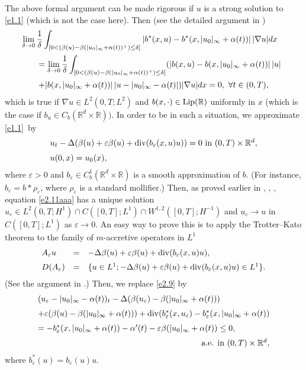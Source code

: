 \documentclass[12pt]{article}
\def\rrd{{\rr^d}}
\def\vsp{\vspace*{1,5mm}\\ }
\def\dd{\displaystyle}
\def\D{{\Delta}}
\def\barr{\begin{array}}
\def\earr{\end{array}}
\def\D{{\Delta}}
\theoremstyle{definition}
\def\1{^{-1}}
\def\vsp{\vspace*{2mm}\\ }
\def\rr{{\mathbb{R}}}
\def\9{{\infty}}
\def\a{{\alpha}}
\def\b{{\beta}}
\def\D{{\Delta}}
\def\vp{{\varepsilon}}
\def\barr{\begin{array}}
\def\earr{\end{array}}
\def\dd{\displaystyle}
\def\vsp{\vspace*{2mm}\\ }
\def\ff{\forall }
\begin{document}
The above formal argument can be made rigorous if $u$ is a strong solution to \eqref{e1.1} (which is not the case here). Then (see the detailed argument in \cite{1})
\begin{equation}\label{e2.11aa}
\hspace*{-2mm}\barr{l}
\dd\lim_{\delta\to0}\frac1\delta
\int_{[0<(\beta(u)-\beta(|u_0|_\9+\a(t))^+)\le\delta]}
|b^*(x,u)-b^*(x,|u_0|_\9+\a(t))|\,|\nabla u|dx\vsp
\qquad=\dd\lim_{\delta\to0}\frac1\delta
\int_{[0<(\beta(u)-\beta(|u_0|_\9+\a(t))^+)\le\delta]}
(|b(x,u)-b(x,|u_0|_\9+\a(t))|\,|u|
\vsp\qquad+|b(x,|u_0|_\9+\a(t))|\,|u-|u_0|_\9-\a(t)|)|\nabla u|dx=0,\ \ff t\in(0,T),\earr\end{equation}which is true if $\nabla u\in L^2(0,T;L^2)$ and $b(x,\cdot)\in{\rm Lip}(\rr)$ uniformly in $x$ (which is the case if $b_u\in C_b(\rrd\times\rr))$. In order to be in  such a situation, we approximate \eqref{e1.1}~by
\begin{equation}\label{e2.11aaa}
\barr{l}
u_t-\D(\b(u)+\vp\b(u)+{\rm div}(b_\vp(x,u)u))=0\mbox{ in }(0,T)\times\rrd,\vsp
u(0,x)=u_0(x),\earr\end{equation}where $\vp>0$ and $b_\vp\in C^1_b(\rrd\times\rr)$ is a smooth approximation of $b$. (For instance, $b_\vp=b*\rho_\vp$, where $\rho_\vp$ is a standard mollifier.) Then, as proved earlier in \cite{1}, \cite{2az}, \cite{2}, equation \eqref{e2.11aaa} has a unique solution $u_\vp\in L^2(0,T;H^1)\cap C([0,T];L^1)\cap W^{1,2}([0,T];H\1)$ and $u_\vp\to u$ in $C([0,T];L^1)$ as $\vp\to0$. An easy way to prove this is to apply the Trotter--Kato theorem to the family of $m$-accretive operators in $L^1$
$$\barr{lcl}
A_\vp u&=&-\D\b(u)+\vp\b(u)+{\rm div}(b_\vp(x,u)u),\vsp 
D(A_\vp)&=&\{u\in L^1;-\Delta\beta(u)+\vp\beta(u)+{\rm div}(b_\vp(x,u)u)\in L^1\}.\earr$$
(See the argument in \cite{2}.) Then, we replace \eqref{e2.9} by
\begin{equation}\label{e2.14a}
\barr{l}
(u_\vp-|u_0|_\9-\a(t))_t-\D(\b(u_\vp)-\b(|u_0|_\9+\a(t)))\vsp
+\vp(\b(u)-\b(|u_0|_\9+\a(t)))+{\rm div}(b^*_\vp(x,u_\vp)-b^*_\vp(x,|u_0|_\9+\a(t))\vsp
=-b^*_\vp(x,|u_0|_\9+\a(t))-\a'(t)-\vp\beta(|u_0|_\9+\a(t))\le0,\vsp\hfill \mbox{ a.e. in }(0,T)\times\rrd,\earr\end{equation}
where $b^*_\vp(u)=b_\vp(u)u.$
\end{document}
